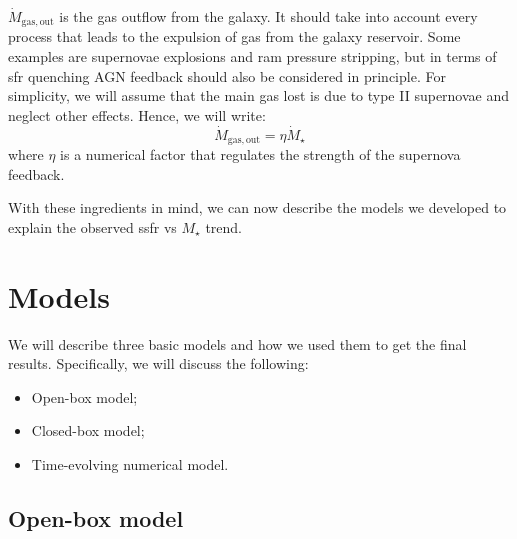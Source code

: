 \documentclass[fleqn, usenatbib]{mnras}
\begin{document}
\(\dot{M}_{\mathrm{gas, out}}\) is the gas outflow from the galaxy. It should take into account every process that leads to the expulsion of gas from the galaxy reservoir. Some examples are supernovae explosions and ram pressure stripping, but in terms of \acrshort{sfr} quenching AGN feedback should also be considered in principle. For simplicity, we will assume that the main gas lost is due to type II supernovae and neglect other effects. Hence, we will write:
\begin{equation} \label{eq:gas_out}
	\dot{M}_{\mathrm{gas, out}} = \eta \dot{M}_{\star}
\end{equation}
where \(\eta\) is a numerical factor that regulates the strength of the supernova feedback.

With these ingredients in mind, we can now describe the models we developed to explain the observed \acrshort{ssfr} vs \(M_{\star}\) trend.

\section{Models}

We will describe three basic models and how we used them to get the final results. Specifically, we will discuss the following:
\begin{itemize}
	\item Open-box model;
	\item Closed-box model;
	\item Time-evolving numerical model.
\end{itemize}

\subsection{Open-box model}
\end{document}
